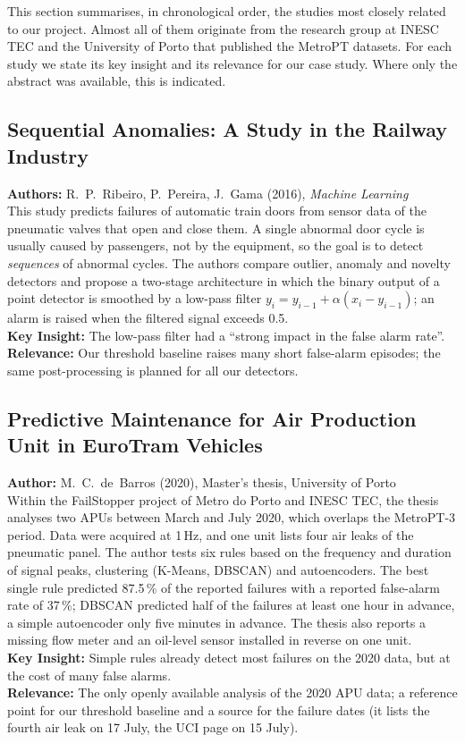 This section summarises, in chronological order, the studies most closely related to our project. Almost all of them originate from the research group at INESC TEC and the University of Porto that published the MetroPT datasets. For each study we state its key insight and its relevance for our case study. Where only the abstract was available, this is indicated.

\subsection[Ribeiro et al. (2016): Sequential Anomalies in the Railway Industry]{Sequential Anomalies: A Study in the Railway Industry}
\textbf{Authors:} R.~P.~Ribeiro, P.~Pereira, J.~Gama (2016), \textit{Machine Learning} \cite{ribeiro2016sequential}\\
This study predicts failures of automatic train doors from sensor data of the pneumatic valves that open and close them. A single abnormal door cycle is usually caused by passengers, not by the equipment, so the goal is to detect \emph{sequences} of abnormal cycles. The authors compare outlier, anomaly and novelty detectors and propose a two-stage architecture in which the binary output of a point detector is smoothed by a low-pass filter $y_i = y_{i-1} + \alpha (x_i - y_{i-1})$; an alarm is raised when the filtered signal exceeds 0.5.\\
\textbf{Key Insight:} The low-pass filter had a ``strong impact in the false alarm rate''.\\
\textbf{Relevance:} Our threshold baseline raises many short false-alarm episodes; the same post-processing is planned for all our detectors.

\subsection[Barros (2020): APU in EuroTram Vehicles]{Predictive Maintenance for Air Production Unit in EuroTram Vehicles}
\textbf{Author:} M.~C.~de~Barros (2020), Master's thesis, University of Porto \cite{barros2020thesis}\\
Within the FailStopper project of Metro do Porto and INESC TEC, the thesis analyses two APUs between March and July 2020, which overlaps the MetroPT-3 period. Data were acquired at 1\,Hz, and one unit lists four air leaks of the pneumatic panel. The author tests six rules based on the frequency and duration of signal peaks, clustering (K-Means, DBSCAN) and autoencoders. The best single rule predicted 87.5\,\% of the reported failures with a reported false-alarm rate of 37\,\%; DBSCAN predicted half of the failures at least one hour in advance, a simple autoencoder only five minutes in advance. The thesis also reports a missing flow meter and an oil-level sensor installed in reverse on one unit.\\
\textbf{Key Insight:} Simple rules already detect most failures on the 2020 data, but at the cost of many false alarms.\\
\textbf{Relevance:} The only openly available analysis of the 2020 APU data; a reference point for our threshold baseline and a source for the failure dates (it lists the fourth air leak on 17 July, the UCI page on 15 July).


